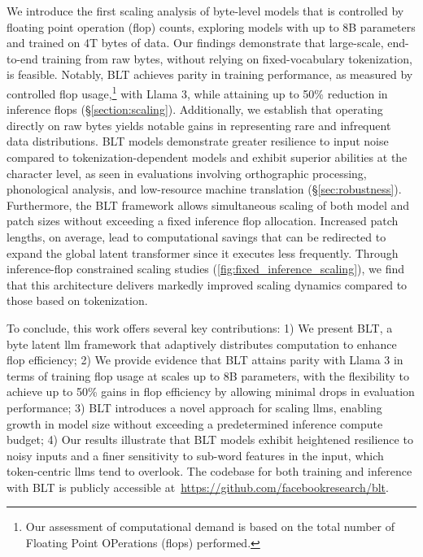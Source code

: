 We introduce the first scaling analysis of byte-level models that is controlled by floating point operation (flop) counts, exploring models with up to 8B parameters and trained on 4T bytes of data. Our findings demonstrate that large-scale, end-to-end training from raw bytes, without relying on fixed-vocabulary tokenization, is feasible. Notably, {\textsc BLT} achieves parity in training performance, as measured by controlled flop usage,\footnote{Our assessment of computational demand is based on the total number of Floating Point OPerations (flops) performed.} with Llama 3, while attaining up to 50\% reduction in inference flops (\S\ref{section:scaling}). Additionally, we establish that operating directly on raw bytes yields notable gains in representing rare and infrequent data distributions. {\textsc BLT} models demonstrate greater resilience to input noise compared to tokenization-dependent models and exhibit superior abilities at the character level, as seen in evaluations involving orthographic processing, phonological analysis, and low-resource machine translation (\S\ref{sec:robustness}). Furthermore, the {\textsc BLT} framework allows simultaneous scaling of both model and patch sizes without exceeding a fixed inference flop allocation. Increased patch lengths, on average, lead to computational savings that can be redirected to expand the global latent transformer since it executes less frequently. Through inference-flop constrained scaling studies (\autoref{fig:fixed_inference_scaling}), we find that this architecture delivers markedly improved scaling dynamics compared to those based on tokenization.

To conclude, this work offers several key contributions: 1) We present {\textsc BLT}, a byte latent llm framework that adaptively distributes computation to enhance flop efficiency; 2) We provide evidence that {\textsc BLT} attains parity with Llama 3 in terms of training flop usage at scales up to 8B parameters, with the flexibility to achieve up to 50\% gains in flop efficiency by allowing minimal drops in evaluation performance; 3) {\textsc BLT} introduces a novel approach for scaling llms, enabling growth in model size without exceeding a predetermined inference compute budget; 4) Our results illustrate that {\textsc BLT} models exhibit heightened resilience to noisy inputs and a finer sensitivity to sub-word features in the input, which token-centric llms tend to overlook. The codebase for both training and inference with {\textsc BLT} is publicly accessible at~\url{https://github.com/facebookresearch/blt}.

